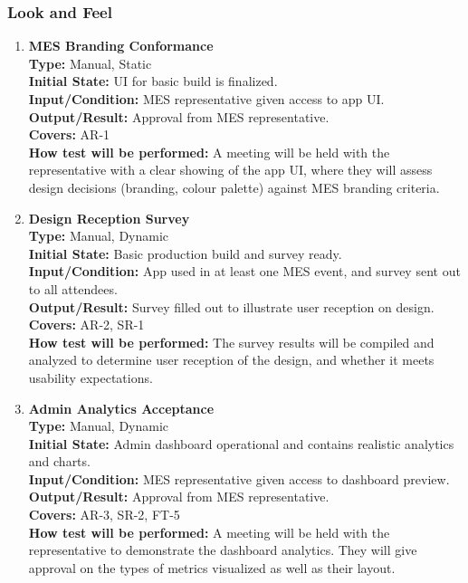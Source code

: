 \documentclass[12pt, titlepage]{article}
\begin{document}
\subsubsection{Look and Feel}
\begin{enumerate}[label=\bfseries LF-\arabic*:, wide=0pt]
  \item \label{test-LF1} \textbf{MES Branding Conformance}\\[2mm]
    {\bf Type:} Manual, Static\\
    {\bf Initial State:} UI for basic build is finalized.\\
    {\bf Input/Condition:} MES representative given access to app UI.\\
    {\bf Output/Result:} Approval from MES representative.\\
    {\bf Covers:} AR-1\\
    {\bf How test will be performed:} A meeting will be held with the representative with a clear showing of the app UI, where they will assess design decisions (branding, colour palette) against MES branding criteria.
  
  \item \label{test-LF2} \textbf{Design Reception Survey}\\[2mm]
    {\bf Type:} Manual, Dynamic\\
    {\bf Initial State:} Basic production build and survey ready.\\
    {\bf Input/Condition:} App used in at least one MES event, and survey sent out to all attendees.\\
    {\bf Output/Result:} Survey filled out to illustrate user reception on design.\\
    {\bf Covers:} AR-2, SR-1\\
    {\bf How test will be performed:} The survey results will be compiled and analyzed to determine user reception of the design, and whether it meets usability expectations.

    \item \label{test-LF3} \textbf{Admin Analytics Acceptance}\\[2mm]
    {\bf Type:} Manual, Dynamic\\
    {\bf Initial State:} Admin dashboard operational and contains realistic analytics and charts.\\
    {\bf Input/Condition:} MES representative given access to dashboard preview.\\
    {\bf Output/Result:} Approval from MES representative.\\
    {\bf Covers:} AR-3, SR-2, FT-5\\
    {\bf How test will be performed:} A meeting will be held with the representative to demonstrate the dashboard analytics. They will give approval on the types of metrics visualized as well as their layout.
\end{enumerate}
\end{document}

